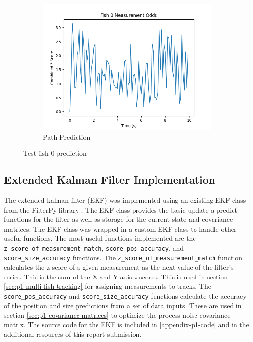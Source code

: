 \documentclass[12pt]{article}
\begin{document}
\begin{figure}[H]
\begin{subfigure}[b]{0.49\textwidth}
        \centering
        \includegraphics[width=\textwidth]{Problem 1/out/p1_test_fish_0_odds.png}
        \caption{Path Prediction}
        \label{fig:p1-test-fish-0-odds}
    \end{subfigure}
    \caption{Test fish 0 prediction}
    \label{fig:p1-test-fish-0}
\end{figure}

\subsection{Extended Kalman Filter Implementation}
The extended kalman filter (EKF) was implemented using an existing EKF class from the FilterPy library \cite{filterpy}. The EKF class provides the basic update a predict functions for the filter as well as storage for the current state and covariance matrices. The EKF class was wrapped in a custom EKF class to handle other useful functions. The most useful functions implemented are the \lstinline{z_score_of_measurement_match}, \lstinline{score_pos_accuracy}, and \lstinline{score_size_accuracy} functions. The \lstinline{z_score_of_measurement_match} function calculates the z-score of a given measurement as the next value of the filter's series. This is the sum of the X and Y axis z-scores. This is used in section \ref{sec:p1-multi-fish-tracking} for assigning measurements to tracks. The \lstinline{score_pos_accuracy} and \lstinline{score_size_accuracy} functions calculate the accuracy of the position and size predictions from a set of data inputs. These are used in section \ref{sec:p1-covariance-matrices} to optimize the process noise covariance matrix. The source code for the EKF is included in \ref{appendix-p1-code} and in the additional resources of this report submission.
\end{document}
